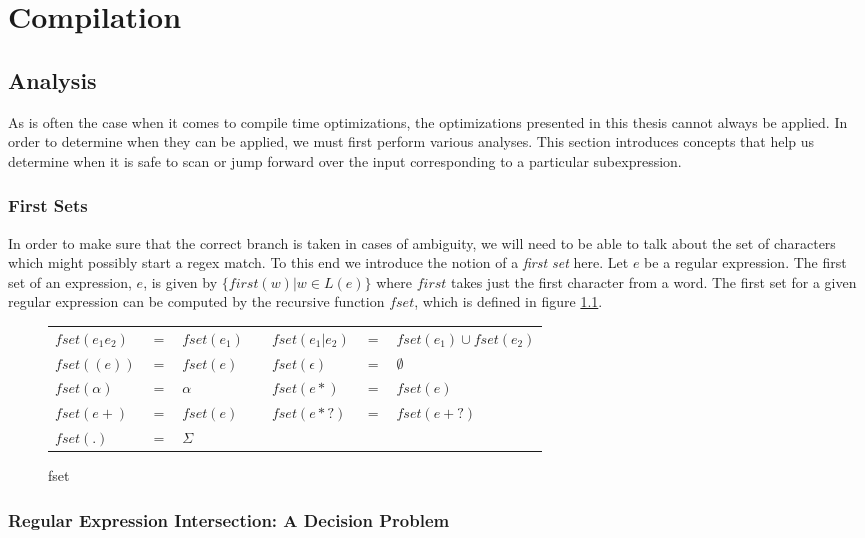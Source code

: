 \chapter{Compilation}
\label{chapter:compilation}

\section{Analysis}

As is often the case when it comes to compile time optimizations,
the optimizations presented in this thesis cannot always be
applied. In order to determine when they can be applied, we must
first perform various analyses. This section introduces concepts
that help us determine when it is safe to scan or jump forward over the
input corresponding to a particular subexpression.

\subsection{First Sets}

In order to make sure that the correct branch is taken in cases of
ambiguity, we will need to be able to talk about the set of characters
which might possibly start a regex match. To this end we introduce the
notion of a \emph{first set} here. Let $e$ be a regular expression.
The first set of an expression, $e$, is given by
$\{first(w) \rvert w \in L(e)\}$ where $first$ takes just the first
character from a word. The first set for a given
regular expression can be computed by the recursive function $fset$,
which is defined in figure \ref{fig:fsetdef}.

\begin{figure}
\label{fig:fsetdef}
\caption{fset}
\begin{tabular}{l c l c l c l}
$fset(e_1 e_2)$ & $=$ & $fset(e_1)$ & &
  $fset(e_1 \rvert e_2)$ & $=$ & $fset(e_1) \cup fset(e_2)$ \\
$fset((e))$ & $=$ & $fset(e)$ & &
  $fset(\epsilon)$ & $=$ & $\emptyset$ \\
$fset(\alpha)$ & $=$ & $\alpha$ & &
  $fset(e*)$ & $=$ & $fset(e)$ \\
$fset(e+)$ & $=$ & $fset(e)$ & &
  $fset(e*?)$ & $=$ & $fset(e+?)$ \\
$fset(.)$ & $=$ & $\Sigma$ & & & & \\
\end{tabular}
\end{figure}

\subsection{Regular Expression Intersection: A Decision Problem}
\label{section:regexinterdecide}

